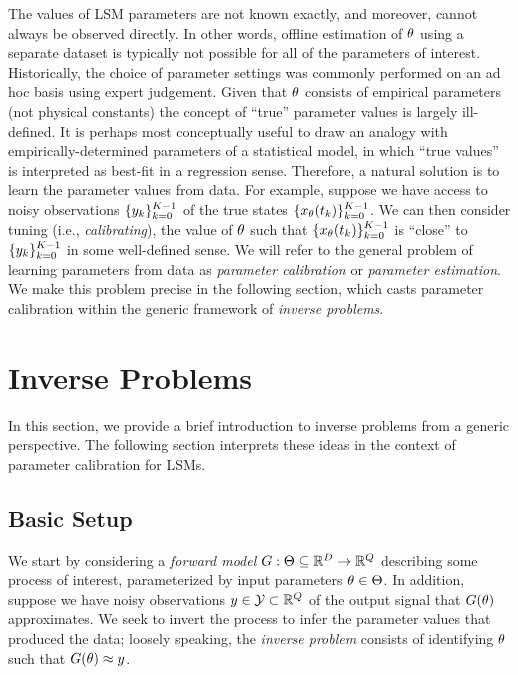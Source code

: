 \documentclass[12pt]{article}
\begin{document}
The values of LSM parameters are not known exactly, and moreover, cannot always be observed directly. In other words, offline estimation of $\theta$
using a separate dataset is typically not possible for all of the parameters of interest. Historically, the choice of parameter settings 
was commonly performed on an ad hoc basis using expert judgement. 
Given that $\theta$ consists of empirical parameters 
(not physical constants) the concept of ``true'' parameter values is largely ill-defined. It is perhaps most conceptually useful to draw an 
analogy with empirically-determined parameters of a statistical model, in which ``true values'' is interpreted as best-fit in a regression sense.
Therefore, a natural solution is to learn the parameter values from data. For example, suppose we have access to noisy observations 
$\{{y}_{k}\}_{k=0}^{K-1}$ of the true states $\{x_{\theta}({t}_{k})\}_{k=0}^{K-1}$. 
We can then consider tuning (i.e., \textit{calibrating}), the value of $\theta$ such that $\{x_{\theta}({t}_{k})\}_{k=0}^{K-1}$
is ``close'' to $\{{y}_{k}\}_{k=0}^{K-1}$  in some well-defined sense. We will refer to the 
general problem of learning parameters from data as \textit{parameter calibration} or \textit{parameter estimation}. We make this 
problem precise in the following section, which casts parameter calibration within the generic framework of \textit{inverse problems}. 

\section{Inverse Problems}
In this section, we provide a brief introduction to inverse problems from a generic perspective. The following section 
interprets these ideas in the context of parameter calibration for LSMs. 

\subsection{Basic Setup}
We start by considering a \textit{forward model} $G: \Theta \subseteq \mathbb{R}^{D} \to \mathbb{R}^{Q}$ describing some 
process of interest, parameterized by input parameters $\theta \in \Theta$. In addition, suppose we have noisy 
observations $y \in \mathcal{Y} \subset \mathbb{R}^{Q}$ of the output signal that $G(\theta)$ approximates. 
We seek to invert the process to infer the parameter values that produced the data; loosely speaking, the 
\textit{inverse problem} consists of identifying $\theta$ such that $G(\theta) \approx y$. 
\end{document}
